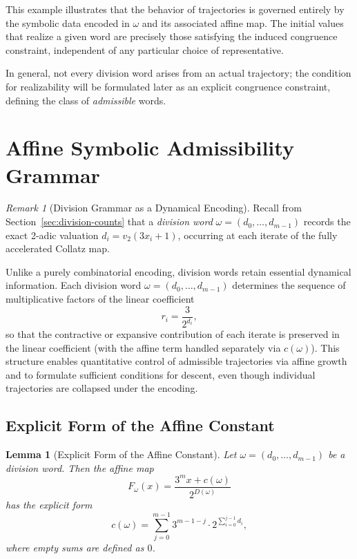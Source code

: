 \documentclass[12pt, oneside]{article}
\numberwithin{equation}{section}
\theoremstyle{definition}
\theoremstyle{plain}
\newtheorem{lemma}[theorem]{Lemma}
\theoremstyle{remark}
\newtheorem*{remark}{Remark}
\begin{document}
This example illustrates that the behavior of trajectories is governed
entirely by the symbolic data encoded in $\omega$ and its associated
affine map. The initial values that realize a given word are precisely
those satisfying the induced congruence constraint, independent of any
particular choice of representative.

\medskip

\noindent
In general, not every division word arises from an actual trajectory;
the condition for realizability will be formulated later as an explicit
congruence constraint, defining the class of \emph{admissible} words.

\section{Affine Symbolic Admissibility Grammar}
\label{sec:affine-grammar}

\begin{remark}[Division Grammar as a Dynamical Encoding]
Recall from Section~\ref{sec:division-counts} that a \emph{division word}
$\omega=(d_0,\dots,d_{m-1})$ records the exact 2-adic valuation
$d_i = v_2(3 x_i + 1)$, occurring at each iterate of the fully accelerated
Collatz map.

Unlike a purely combinatorial encoding, division words retain essential
dynamical information. Each division word $\omega=(d_0,\dots,d_{m-1})$
determines the sequence of multiplicative factors of the linear coefficient
\[
r_i = \frac{3}{2^{d_i}},
\]
so that the contractive or expansive contribution of each iterate is
preserved in the linear coefficient (with the affine term handled separately
via $c(\omega)$). This structure enables quantitative control of admissible
trajectories via affine growth and to formulate sufficient conditions for
descent, even though individual trajectories are collapsed under the encoding.
\end{remark}

\subsection{Explicit Form of the Affine Constant}
\begin{lemma}[Explicit Form of the Affine Constant]
Let $\omega = (d_0,\dots,d_{m-1})$ be a division word. Then the affine map
\[
F_\omega(x) = \frac{3^m x + c(\omega)}{2^{D(\omega)}}
\]
has the explicit form
\[
c(\omega)
=
\sum_{j=0}^{m-1}
3^{m-1-j}\cdot 2^{\sum_{i=0}^{j-1} d_i},
\]
where empty sums are defined as $0$.
\end{lemma}
\end{document}
